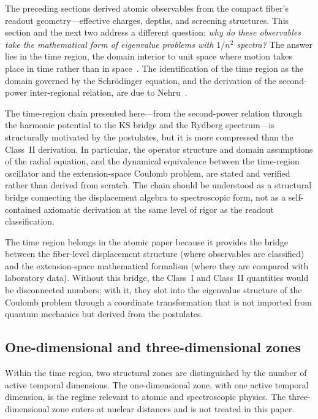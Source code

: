 \documentclass[11pt,a4paper]{article}
\begin{document}
The preceding sections derived atomic observables from the compact fiber's readout geometry---effective charges, depths, and screening structures. This section and the next two address a different question: \emph{why do these observables take the mathematical form of eigenvalue problems with $1/n^2$ spectra?} The answer lies in the time region, the domain interior to unit space where motion takes place in time rather than in space~\cite{Larson1979}. The identification of the time region as the domain governed by the Schr\"odinger equation, and the derivation of the second-power inter-regional relation, are due to Nehru~\cite{Nehru1988}.

The time-region chain presented here---from the second-power relation through the harmonic potential to the KS bridge and the Rydberg spectrum---is structurally motivated by the postulates, but it is more compressed than the Class~II derivation. In particular, the operator structure and domain assumptions of the radial equation, and the dynamical equivalence between the time-region oscillator and the extension-space Coulomb problem, are stated and verified rather than derived from scratch. The chain should be understood as a structural bridge connecting the displacement algebra to spectroscopic form, not as a self-contained axiomatic derivation at the same level of rigor as the readout classification.

The time region belongs in the atomic paper because it provides the bridge between the fiber-level displacement structure (where observables are classified) and the extension-space mathematical formalism (where they are compared with laboratory data). Without this bridge, the Class~I and Class~II quantities would be disconnected numbers; with it, they slot into the eigenvalue structure of the Coulomb problem through a coordinate transformation that is not imported from quantum mechanics but derived from the postulates.

\subsection{One-dimensional and three-dimensional zones}

Within the time region, two structural zones are distinguished by the number of active temporal dimensions. The one-dimensional zone, with one active temporal dimension, is the regime relevant to atomic and spectroscopic physics. The three-dimensional zone enters at nuclear distances and is not treated in this paper.
\end{document}
